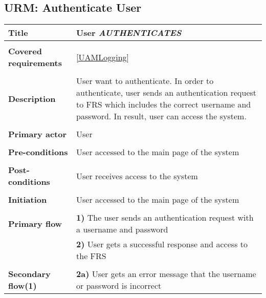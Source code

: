 \documentclass[a4paper,11pt]{article}
\begin{document}
\subsection{URM: Authenticate User}

\begin{tabular}{|p{3.5cm}|p{11.5cm}|} \hline
    \textbf{Title} &   User \emph{AUTHENTICATES}

    \\ \hline \rowcolor{Gray} & \\ \hline

    \textbf{Covered requirements} & \ref{UAMLogging}

    \\ \hline \rowcolor{Gray} & \\ \hline

    \textbf{Description} &  User want to authenticate. In order to authenticate, user sends an authentication request to FRS which includes the correct username and password. In result, user can access the system.

    \\ \hline \rowcolor{Gray} & \\ \hline

    \textbf{Primary actor} & User

    \\ \hline \rowcolor{Gray} & \\ \hline

    \textbf{Pre-conditions} &   User accessed to the main page of the system

    \\ \hline \rowcolor{Gray} & \\ \hline

    \textbf{Post-conditions} &   User receives access to the system

    \\ \hline \rowcolor{Gray} & \\ \hline

    \textbf{Initiation} & User accessed to the main page of the system

    \\ \hline \rowcolor{Gray} & \\ \hline

    \textbf{Primary flow} &
    \textbf{1)} The user sends an authentication request with a username and password  \\&
    \textbf{2)} User gets a successful response and access to the FRS

    \\ \hline \rowcolor{Gray} & \\ \hline

    \textbf{Secondary flow(1)} &
    \textbf{2a)} User gets an error message that the username or password is incorrect

    \\ \hline
\end{tabular}
\end{document}
